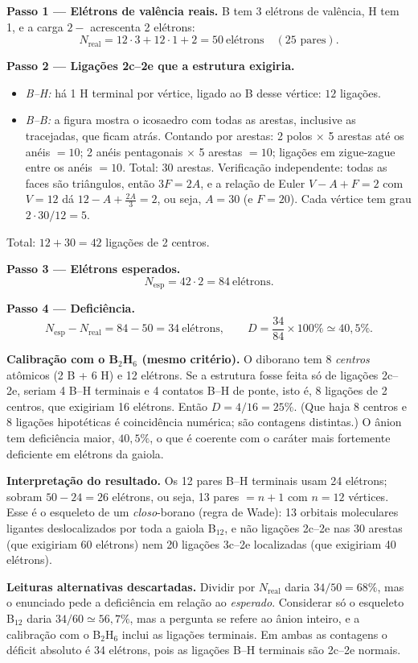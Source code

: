 \documentclass{article}%
\begin{document}
\textbf{Passo 1 --- Elétrons de valência reais.} B tem 3 elétrons de valência, H tem 1, e a carga $2-$ acrescenta 2 elétrons:
\[
N_{\text{real}} = 12\cdot 3 + 12\cdot 1 + 2 = 50 \ \text{elétrons} \quad (25 \text{ pares}).
\]

\textbf{Passo 2 --- Ligações 2c--2e que a estrutura exigiria.}
\begin{itemize}
\item \emph{B--H:} há 1 H terminal por vértice, ligado ao B desse vértice: $12$ ligações.
\item \emph{B--B:} a figura mostra o icosaedro com todas as arestas, inclusive as tracejadas, que ficam atrás. Contando por arestas: 2 polos $\times$ 5 arestas até os anéis $=10$; 2 anéis pentagonais $\times$ 5 arestas $=10$; ligações em zigue-zague entre os anéis $=10$. Total: $30$ arestas. Verificação independente: todas as faces são triângulos, então $3F=2A$, e a relação de Euler $V-A+F=2$ com $V=12$ dá $12-A+\tfrac{2A}{3}=2$, ou seja, $A=30$ (e $F=20$). Cada vértice tem grau $2\cdot30/12=5$.
\end{itemize}
Total: $12+30=42$ ligações de 2 centros.

\textbf{Passo 3 --- Elétrons esperados.}
\[
N_{\text{esp}} = 42\cdot 2 = 84 \ \text{elétrons}.
\]

\textbf{Passo 4 --- Deficiência.}
\[
N_{\text{esp}}-N_{\text{real}} = 84-50 = 34 \ \text{elétrons},
\qquad
D=\frac{34}{84}\times 100\% \simeq 40{,}5\%.
\]

\textbf{Calibração com o B$_2$H$_6$ (mesmo critério).} O diborano tem 8 \emph{centros} atômicos (2 B + 6 H) e 12 elétrons. Se a estrutura fosse feita só de ligações 2c--2e, seriam 4 B--H terminais e 4 contatos B--H de ponte, isto é, 8 ligações de 2 centros, que exigiriam 16 elétrons. Então $D=4/16=25\%$. (Que haja 8 centros e 8 ligações hipotéticas é coincidência numérica; são contagens distintas.) O ânion tem deficiência maior, $40{,}5\%$, o que é coerente com o caráter mais fortemente deficiente em elétrons da gaiola.

\textbf{Interpretação do resultado.} Os 12 pares B--H terminais usam 24 elétrons; sobram $50-24=26$ elétrons, ou seja, 13 pares $=n+1$ com $n=12$ vértices. Esse é o esqueleto de um \emph{closo}-borano (regra de Wade): 13 orbitais moleculares ligantes deslocalizados por toda a gaiola B$_{12}$, e não ligações 2c--2e nas 30 arestas (que exigiriam 60 elétrons) nem 20 ligações 3c--2e localizadas (que exigiriam 40 elétrons).

\textbf{Leituras alternativas descartadas.} Dividir por $N_{\text{real}}$ daria $34/50=68\%$, mas o enunciado pede a deficiência em relação ao \emph{esperado}. Considerar só o esqueleto B$_{12}$ daria $34/60\simeq56{,}7\%$, mas a pergunta se refere ao ânion inteiro, e a calibração com o B$_2$H$_6$ inclui as ligações terminais. Em ambas as contagens o déficit absoluto é 34 elétrons, pois as ligações B--H terminais são 2c--2e normais.
\end{document}
